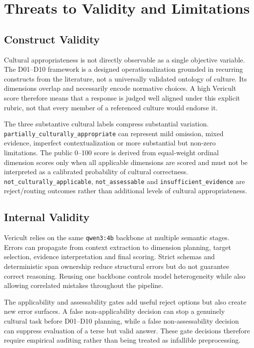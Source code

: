 \chapter{Threats to Validity and Limitations}
\label{ch:limitations}

\section{Construct Validity}

Cultural appropriateness is not directly observable as a single objective variable. The D01--D10 framework is a designed operationalization grounded in recurring constructs from the literature, not a universally validated ontology of culture. Its dimensions overlap and necessarily encode normative choices. A high Vericult score therefore means that a response is judged well aligned under this explicit rubric, not that every member of a referenced culture would endorse it.

The three substantive cultural labels compress substantial variation. \texttt{partially\_culturally\_appropriate} can represent mild omission, mixed evidence, imperfect contextualization or more substantial but non-zero limitations. The public 0--100 score is derived from equal-weight ordinal dimension scores only when all applicable dimensions are scored and must not be interpreted as a calibrated probability of cultural correctness. \texttt{not\_culturally\_applicable}, \texttt{not\_assessable} and \texttt{insufficient\_evidence} are reject/routing outcomes rather than additional levels of cultural appropriateness.

\section{Internal Validity}

Vericult relies on the same \texttt{qwen3:4b} backbone at multiple semantic stages. Errors can propagate from context extraction to dimension planning, target selection, evidence interpretation and final scoring. Strict schemas and deterministic span ownership reduce structural errors but do not guarantee correct reasoning. Reusing one backbone controls model heterogeneity while also allowing correlated mistakes throughout the pipeline.

The applicability and assessability gates add useful reject options but also create new error surfaces. A false non-applicability decision can stop a genuinely cultural task before D01--D10 planning, while a false non-assessability decision can suppress evaluation of a terse but valid answer. These gate decisions therefore require empirical auditing rather than being treated as infallible preprocessing.

